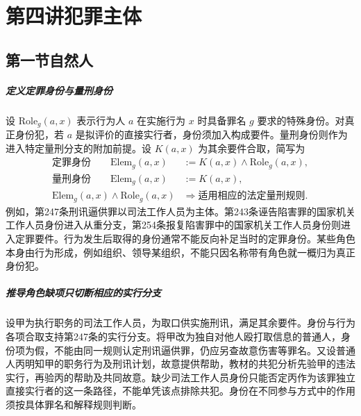 \chapter{第四讲\quad 犯罪主体}
\label{lecture:04}
\par

\section{第一节\quad 自然人}

\paragraph{定义\quad 定罪身份与量刑身份}
设 \(\mathrm{Role}_g(a,x)\) 表示行为人 \(a\) 在实施行为 \(x\) 时具备罪名 \(g\) 要求的特殊身份。对真正身份犯，若 \(a\) 是拟评价的直接实行者，身份须加入构成要件。量刑身份则作为进入特定量刑分支的附加前提。设 \(K(a,x)\) 为其余要件合取，简写为
\begin{align*}
 \text{定罪身份}\qquad \mathrm{Elem}_g(a,x)
  &:=K(a,x)\land\mathrm{Role}_g(a,x),\\
 \text{量刑身份}\qquad \mathrm{Elem}_g(a,x)
  &:=K(a,x),\\
 \mathrm{Elem}_g(a,x)\land\mathrm{Role}_g(a,x)
  &\Rightarrow \text{适用相应的法定量刑规则}.
\end{align*}
例如，第247条刑讯逼供罪以司法工作人员为主体。第243条诬告陷害罪的国家机关工作人员身份进入从重分支，第254条报复陷害罪中的国家机关工作人员身份则进入定罪要件。行为发生后取得的身份通常不能反向补足当时的定罪身份。某些角色本身由行为形成，例如组织、领导某组织，不能只因名称带有角色就一概归为真正身份犯。

\paragraph{推导\quad 角色缺项只切断相应的实行分支}
设甲为执行职务的司法工作人员，为取口供实施刑讯，满足其余要件。身份与行为各项合取支持第247条的实行分支。将甲改为独自对他人殴打取信息的普通人，身份项为假，不能由同一规则认定刑讯逼供罪，仍应另查故意伤害等罪名。又设普通人丙明知甲的职务行为及刑讯计划，故意提供帮助，教材的共犯分析先验甲的违法实行，再验丙的帮助及共同故意。缺少司法工作人员身份只能否定丙作为该罪独立直接实行者的这一条路径，不能单凭该点排除共犯。身份在不同参与方式中的作用须按具体罪名和解释规则判断。

